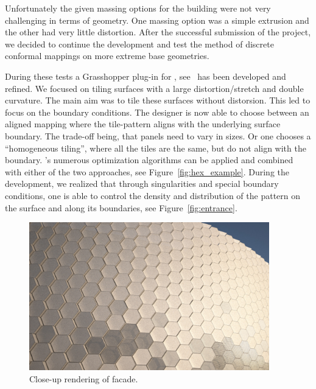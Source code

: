\documentclass[article.tex]{subfiles}
\begin{document}
Unfortunately the given massing options for the building were not very
challenging in terms of geometry. One massing option was a simple
extrusion and the other had very little distortion. After the
successful submission of the project, we decided to continue the
development and test the method of discrete conformal mappings on more
extreme base geometries.

During these tests a Grasshopper plug-in for \VaryLab,
see~\cite{varylab-web-page} has been developed and refined. We focused
on tiling surfaces with a large distortion/stretch and double
curvature. The main aim was to tile these surfaces without
distorsion. This led to focus on the boundary conditions. The designer
is now able to choose between an aligned mapping where the tile-pattern
aligns with the underlying surface boundary. The trade-off being, that
panels need to vary in sizes. Or one chooses a ``homogeneous tiling'',
where all the tiles are the same, but do not align with the
boundary. \VaryLab's numerous optimization algorithms can be applied
and combined with either of the two approaches, see
Figure~\ref{fig:hex_example}. During the development, we realized that
through singularities and special boundary conditions, one is able to
control the density and distribution of the pattern on the surface and
along its boundaries, see Figure~\ref{fig:entrance}.

\begin{figure}[bt]
  \centering
  \includegraphics[width=0.93\textwidth]{images/henn/detail.jpg}
  \caption{Close-up rendering of facade.}
  \label{fig:detail}
\end{figure}
\end{document}
